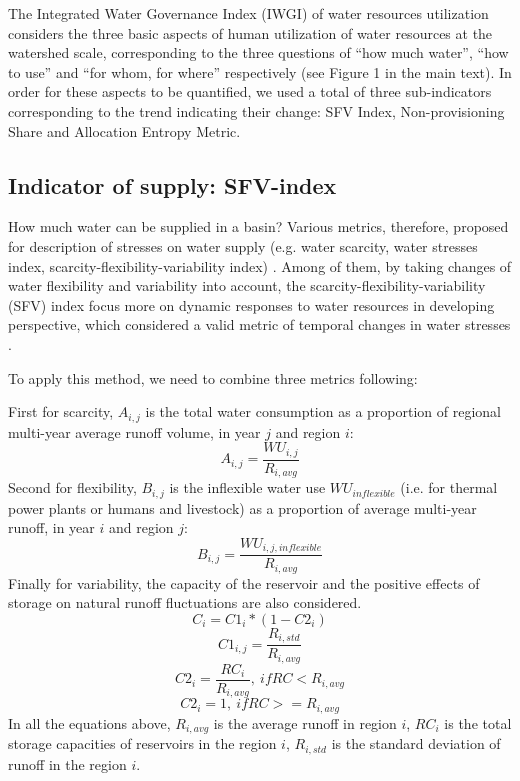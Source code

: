 \documentclass[9pt,twoside,lineno]{pnas-new}
\begin{document}
The Integrated Water Governance Index (IWGI) of water resources utilization considers the three basic aspects of human utilization of water resources at the watershed scale, corresponding to the three questions of ``how much water'', ``how to use'' and ``for whom, for where'' respectively (see Figure 1 in the main text).
In order for these aspects to be quantified, we used a total of three sub-indicators corresponding to the trend indicating their change: SFV Index, Non-provisioning Share and Allocation Entropy Metric.

\subsection*{Indicator of supply: SFV-index}
	How much water can be supplied in a basin?
    Various metrics, therefore, proposed for description of stresses on water supply (e.g. water scarcity, water stresses index, scarcity-flexibility-variability index)
    \cite{qinFlexibilityintensityglobal2019,bestAnthropogenicstressesworld2019,florke2018}.
    Among of them, by taking changes of water flexibility and variability into account,	the scarcity-flexibility-variability (SFV) index focus more on dynamic responses to water resources in developing perspective, which considered a valid metric of temporal changes in water stresses \cite{qinFlexibilityintensityglobal2019}.

	To apply this method, we need to combine three metrics following:

	First for scarcity, $A_{i, j}$ is the total water consumption as a proportion of regional multi-year average runoff volume, in year $j$ and region $i$:
	$$ A_{i, j} = \frac{WU_{i,j}}{R_{i, avg}} $$
	Second for flexibility, $B_{i, j}$ is the inflexible water use $WU_{inflexible}$ (i.e. for thermal power plants or humans and livestock) as a proportion of average multi-year runoff, in year $i$ and region $j$:
	$$ B_{i, j} = \frac{WU_{i, j, inflexible}}{R_{i, avg}} $$
	Finally for variability, the capacity of the reservoir and the positive effects of storage on natural runoff fluctuations are also considered.
	$$ C_i = C1_i * (1 - C2_i) $$
	$$ C1_{i, j} = \frac{R_{i, std}}{R_{i, avg}} $$
	$$ C2_{i} = \frac{RC_{i}}{R_{i, avg}}, \ if RC < R_{i, avg} $$
	$$ C2_{i} = 1, \ if RC >= R_{i, avg} $$
	In all the equations above, $R_{i, avg}$ is the average runoff in region $i$, $RC_i$ is the total storage capacities of reservoirs in the region $i$, $R_{i, std}$ is the standard deviation of runoff in the region $i$.
\end{document}
